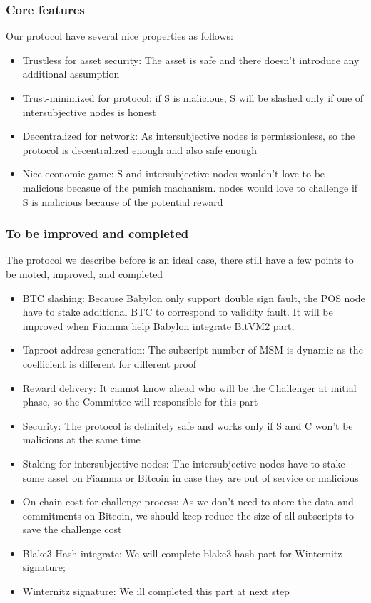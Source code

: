 \subsubsection{Core features}

Our protocol have several nice properties as follows:

\begin{itemize}
    \item Trustless for asset security: The asset is safe and there doesn't introduce any additional assumption
    \item Trust-minimized for protocol: if S is malicious, S will be slashed only if one of intersubjective nodes is honest
    \item Decentralized for network: As intersubjective nodes is permissionless, so the protocol is decentralized enough and also safe enough
    \item Nice economic game: S and intersubjective nodes wouldn't love to be malicious becasue of the punish machanism. nodes would love to challenge if S is malicious because of the potential reward
\end{itemize}

\subsubsection{To be improved and completed}

The protocol we describe before is an ideal case, there still have a few points to be moted, improved, and completed

\begin{itemize}
    \item BTC slashing: Because Babylon only support double sign fault, the POS node have to stake additional BTC to correspond to validity fault. It will be improved when Fiamma help Babylon integrate BitVM2 part;
    \item Taproot address generation: The subscript number of MSM is dynamic as the coefficient is different for different proof 
    \item Reward delivery: It cannot know ahead who will be the Challenger at initial phase, so the Committee will responsible for this part
    \item Security: The protocol is definitely safe and works only if S and C won't be malicious at the same time
    \item Staking for intersubjective nodes: The intersubjective nodes have to stake some asset on Fiamma or Bitcoin in case they are out of service or malicious
    \item On-chain cost for challenge process: As we don't need to store the data and commitments on Bitcoin, we should keep reduce the size of all subscripts to save the challenge cost
    \item Blake3 Hash integrate: We will complete blake3 hash part for Winternitz \cite{website:witernitz} signature;
    \item Winternitz signature: We ill completed this part at next step
\end{itemize}
